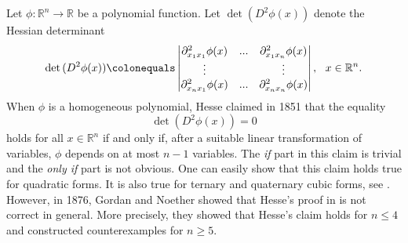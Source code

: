 \documentclass[a4paper, 11pt]{article}
\theoremstyle{plain}
\newtheorem{theorem}{Theorem}[section]
\theoremstyle{definition}
\theoremstyle{lemma}
\theoremstyle{Remark}
\theoremstyle{proposition}
\theoremstyle{corollary}
\theoremstyle{example}
\theoremstyle{assumption}
\begin{document}
Let $\phi:\mathbb{R}^n\to \mathbb{R}$ be a polynomial function. Let $\det{(D^2\phi(x))}$ denote the Hessian determinant
$$\det{(D^2\phi(x))}\colonequals \begin{vmatrix}
\partial^2_{x_1x_1}\phi(x) &...&\partial^2_{x_1x_n}\phi (x)\\\vdots  & & \vdots\\
\partial^2_{x_nx_1}\phi(x) &...&\partial^2_{x_nx_n}\phi (x)
\end{vmatrix},\,\,\,\,x\in \mathbb{R}^n.$$
When $\phi$ is  a homogeneous polynomial, Hesse \cite{H1, H2} claimed in 1851 that the equality
$$\det{(D^2\phi(x))}=0$$
 holds for all $x\in \mathbb{R}^n$ if and only if, after a suitable linear  transformation of  variables,  $\phi$ depends on at most $n-1$ variables. The \emph{if} part in this claim is trivial and the \emph{only if} part is not obvious. One can easily show  that this claim holds true for  quadratic forms. It is also true for ternary and quaternary cubic forms, see \cite{Pasch}.  However, in 1876, Gordan and Noether \cite{GN, Los, J.B} showed that Hesse's proof in \cite{H1, H2} is not correct in general. More precisely, they showed that Hesse's claim holds for $n\leq 4$ and constructed counterexamples  for $n\geq 5.$ %
\end{document}
